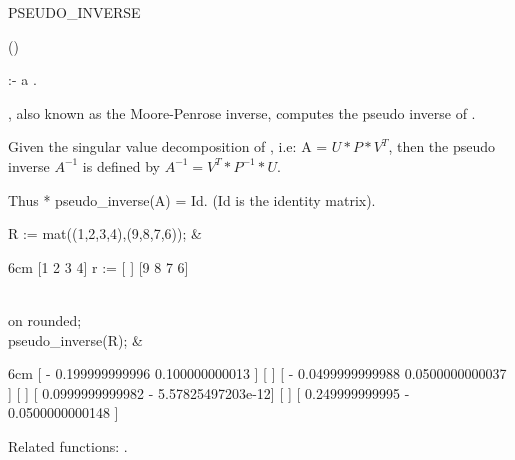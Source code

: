\begin{Operator}[pseudoinverse]{PSEUDO_INVERSE}

\begin{Syntax}
()
\end{Syntax}

 :- a .

, also known as the Moore-Penrose inverse, 
computes the pseudo inverse of . 

Given the singular value decomposition of , i.e: 
A = $U*P*V^T$, then the pseudo inverse $A^{-1}$ is defined by
$A^{-1} = V^T*P^{-1}*U$.

Thus  *  pseudo\_inverse(A) = Id.
(Id is the identity matrix).


\begin{Examples}

R := mat((1,2,3,4),(9,8,7,6)); &
\begin{multilineoutput}{6cm}
     [1  2  3  4]
r := [          ]
     [9  8  7  6]
\end{multilineoutput}\\

on rounded; \\
pseudo_inverse(R); &
\begin{multilineoutput}{6cm}
[ - 0.199999999996      0.100000000013   ]
[                                        ]
[ - 0.0499999999988    0.0500000000037   ]
[                                        ]
[ 0.0999999999982     - 5.57825497203e-12]
[                                        ]
[  0.249999999995      - 0.0500000000148 ]
\end{multilineoutput}

\end{Examples}


Related functions: .

\end{Operator}


